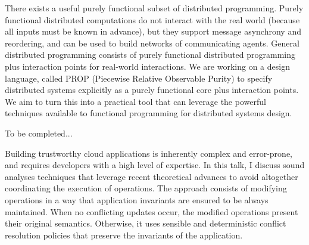 \documentclass[a4paper,UKenglish]{dagrep-v2018}
\begin{document}

\license

There exists a useful purely functional subset of distributed programming.  Purely functional distributed computations do not interact with the real world (because all inputs must be known in advance), but they support message asynchrony and reordering, and can be used to build networks of communicating agents.  General distributed programming consists of purely functional distributed programming plus interaction points for real-world interactions.  We are working on a design language, called PROP (Piecewise Relative Observable Purity) to specify distributed systems explicitly as a purely functional core plus interaction points.  We aim to turn this into a practical tool that can leverage the powerful techniques available to functional programming for distributed systems design.


\license

To be completed...


\license

Building trustworthy cloud applications is inherently complex and error-prone, and requires developers with a high level of expertise. In this talk, I discuss sound analyses techniques that leverage recent theoretical advances to avoid altogether coordinating the execution of operations. The approach consists of modifying operations in a way that application invariants are ensured to be always maintained. When no conflicting updates occur, the modified operations present their original semantics. Otherwise, it uses sensible and deterministic conflict resolution policies that preserve the invariants of the application.
\end{document}
